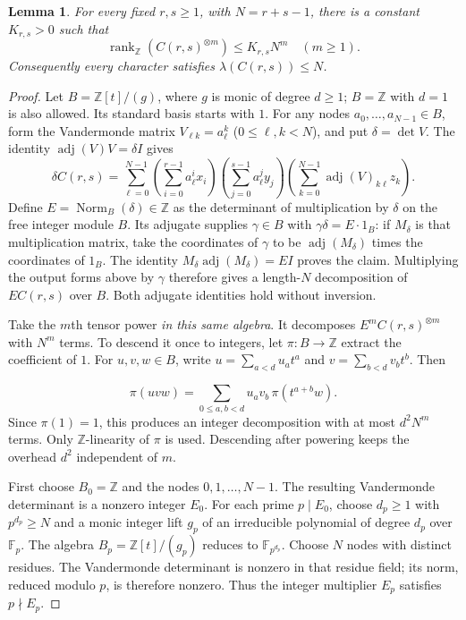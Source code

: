 \documentclass[11pt]{article}
\newtheorem{lemma}[theorem]{Lemma}
\theoremstyle{remark}
\newcommand{\Z}{\mathbb Z}
\newcommand{\rk}{\operatorname{rank}_{\Z}}
\DeclareMathOperator{\Norm}{Norm}
\begin{document}
\begin{lemma}\label{lem:conv}
For every fixed $r,s\geq1$, with $N=r+s-1$, there is a constant
$K_{r,s}>0$ such that
\[
 \rk(C(r,s)^{\otimes m})\leq K_{r,s}N^m\quad(m\geq1).
\]
Consequently every character satisfies $\lambda(C(r,s))\leq N$.
\end{lemma}
\begin{proof}
Let $B=\Z[t]/(g)$, where $g$ is monic of degree $d\geq1$; $B=\Z$
with $d=1$ is also allowed. Its standard basis starts with $1$.
For any nodes $a_0,\ldots,a_{N-1}\in B$, form the Vandermonde matrix
$V_{\ell k}=a_\ell^k$ ($0\leq\ell,k<N$), and put
$\delta=\det V$. The identity $\operatorname{adj}(V)V=\delta I$ gives
\[
 \delta C(r,s)=\sum_{\ell=0}^{N-1}
 \left(\sum_{i=0}^{r-1}a_\ell^i x_i\right)
 \left(\sum_{j=0}^{s-1}a_\ell^j y_j\right)
 \left(\sum_{k=0}^{N-1}\operatorname{adj}(V)_{k\ell}z_k\right).
\]
Define $E=\Norm_B(\delta)\in\Z$ as the determinant of multiplication
by $\delta$ on the free integer module $B$. Its adjugate supplies
$\gamma\in B$ with $\gamma\delta=E\cdot1_B$: if $M_\delta$ is that
multiplication matrix, take the coordinates of $\gamma$ to be
$\operatorname{adj}(M_\delta)$ times the coordinates of $1_B$.
The identity $M_\delta\operatorname{adj}(M_\delta)=EI$ proves the claim.
Multiplying the output
forms above by $\gamma$ therefore gives a length-$N$ decomposition of
$EC(r,s)$ over $B$. Both adjugate identities hold without inversion.

Take the $m$th tensor power \emph{in this same algebra}. It decomposes
$E^mC(r,s)^{\otimes m}$ with $N^m$ terms. To descend it once to integers,
let $\pi:B\to\Z$ extract the coefficient of $1$. For $u,v,w\in B$,
write $u=\sum_{a<d}u_at^a$ and $v=\sum_{b<d}v_bt^b$. Then

\[
 \pi(uvw)=\sum_{0\leq a,b<d}u_a v_b\,\pi(t^{a+b}w).
\]
Since $\pi(1)=1$, this produces an integer decomposition with at most
$d^2N^m$ terms. Only $\Z$-linearity of $\pi$ is used. Descending after
powering keeps the overhead $d^2$ independent of $m$.

First choose $B_0=\Z$ and the nodes $0,1,\ldots,N-1$.
The resulting Vandermonde determinant is a nonzero integer $E_0$.
For each prime $p\mid E_0$, choose $d_p\geq1$ with $p^{d_p}\geq N$
and a monic integer lift $g_p$ of an irreducible polynomial of
degree $d_p$ over $\mathbb F_p$.
The algebra $B_p=\Z[t]/(g_p)$ reduces to $\mathbb F_{p^{d_p}}$.
Choose $N$ nodes with distinct residues. The Vandermonde determinant
is nonzero in that residue field; its norm, reduced modulo $p$, is
therefore nonzero. Thus the integer multiplier $E_p$ satisfies
$p\nmid E_p$.


\end{proof}
\end{document}
